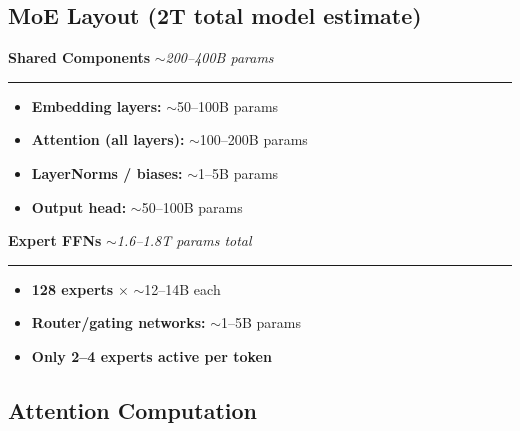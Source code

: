 \documentclass[11pt,a4paper]{article}
\begin{document}
\subsection{MoE Layout (2T total model estimate)}

\begin{tcolorbox}[
  colback=blue!3,
  colframe=blue!60!black,
  title={\centering\large\bfseries Claude Opus 4.6 --- MoE Architecture Layout\\[2pt]\normalsize (2T total parameters)},
  fonttitle=\color{white},
  coltitle=white,
  arc=3mm,
  boxrule=1pt
]

\textbf{\color{blue!70!black}\large Shared Components} \hfill \textit{$\sim$200--400B params}
\vspace{2pt}
\hrule
\vspace{4pt}
\begin{itemize}[leftmargin=1.5em, itemsep=1pt]
  \item \textbf{Embedding layers:} $\sim$50--100B params
  \item \textbf{Attention (all layers):} $\sim$100--200B params
  \item \textbf{LayerNorms / biases:} $\sim$1--5B params
  \item \textbf{Output head:} $\sim$50--100B params
\end{itemize}

\vspace{6pt}
\textbf{\color{blue!70!black}\large Expert FFNs} \hfill \textit{$\sim$1.6--1.8T params total}
\vspace{2pt}
\hrule
\vspace{4pt}
\begin{itemize}[leftmargin=1.5em, itemsep=1pt]
  \item \textbf{128 experts} $\times$ $\sim$12--14B each
  \item \textbf{Router/gating networks:} $\sim$1--5B params
  \item \textbf{Only 2--4 experts active per token}
\end{itemize}

\vspace{6pt}
\begin{center}
\fboxsep=8pt
\end{center}

\end{tcolorbox}

\subsection{Attention Computation}
\end{document}
